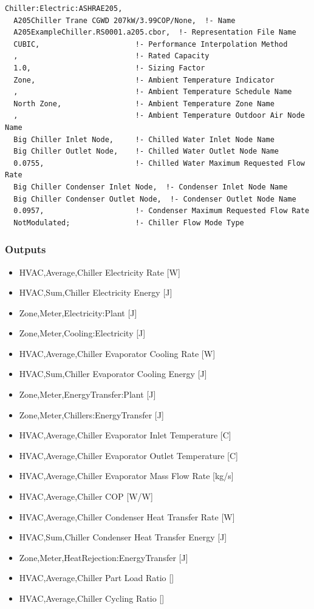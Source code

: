 \begin{lstlisting}
Chiller:Electric:ASHRAE205,
  A205Chiller Trane CGWD 207kW/3.99COP/None,  !- Name
  A205ExampleChiller.RS0001.a205.cbor,  !- Representation File Name
  CUBIC,                      !- Performance Interpolation Method
  ,                           !- Rated Capacity
  1.0,                        !- Sizing Factor
  Zone,                       !- Ambient Temperature Indicator
  ,                           !- Ambient Temperature Schedule Name
  North Zone,                 !- Ambient Temperature Zone Name
  ,                           !- Ambient Temperature Outdoor Air Node Name
  Big Chiller Inlet Node,     !- Chilled Water Inlet Node Name
  Big Chiller Outlet Node,    !- Chilled Water Outlet Node Name
  0.0755,                     !- Chilled Water Maximum Requested Flow Rate
  Big Chiller Condenser Inlet Node,  !- Condenser Inlet Node Name
  Big Chiller Condenser Outlet Node,  !- Condenser Outlet Node Name
  0.0957,                     !- Condenser Maximum Requested Flow Rate
  NotModulated;               !- Chiller Flow Mode Type
\end{lstlisting}

\subsubsection{Outputs}

\begin{itemize}
    \item
    HVAC,Average,Chiller Electricity Rate {[}W{]}
    \item
    HVAC,Sum,Chiller Electricity Energy {[}J{]}
    \item
    Zone,Meter,Electricity:Plant {[}J{]}
    \item
    Zone,Meter,Cooling:Electricity {[}J{]}
    \item
    HVAC,Average,Chiller Evaporator Cooling Rate {[}W{]}
    \item
    HVAC,Sum,Chiller Evaporator Cooling Energy {[}J{]}
    \item
    Zone,Meter,EnergyTransfer:Plant {[}J{]}
    \item
    Zone,Meter,Chillers:EnergyTransfer {[}J{]}
    \item
    HVAC,Average,Chiller Evaporator Inlet Temperature {[}C{]}
    \item
    HVAC,Average,Chiller Evaporator Outlet Temperature {[}C{]}
    \item
    HVAC,Average,Chiller Evaporator Mass Flow Rate {[}kg/s{]}
    \item
    HVAC,Average,Chiller COP {[}W/W{]}
    \item
    HVAC,Average,Chiller Condenser Heat Transfer Rate {[}W{]}
    \item
    HVAC,Sum,Chiller Condenser Heat Transfer Energy {[}J{]}
    \item
    Zone,Meter,HeatRejection:EnergyTransfer {[}J{]}
    \item
    HVAC,Average,Chiller Part Load Ratio {[]}
    \item
    HVAC,Average,Chiller Cycling Ratio {[]}
\end{itemize}

